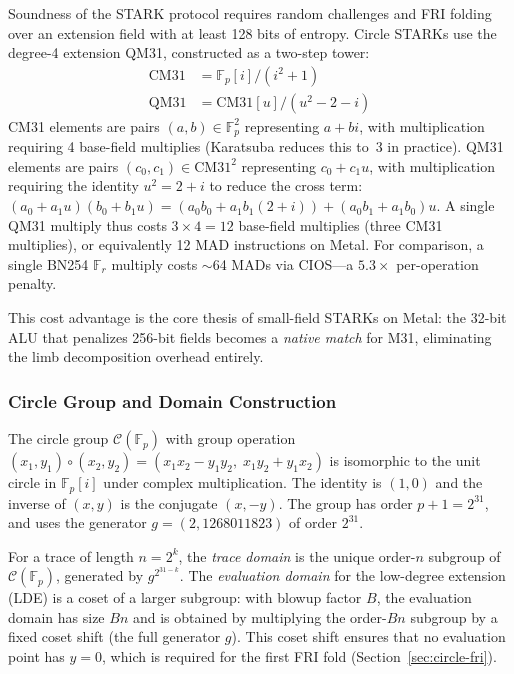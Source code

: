 Soundness of the STARK protocol requires random challenges and FRI folding
over an extension field with at least 128 bits of entropy.  Circle STARKs
use the degree-4 extension QM31, constructed as a two-step tower:
%
\begin{align}
  \text{CM31} &= \mathbb{F}_p[i] / (i^2 + 1) \label{eq:cm31} \\
  \text{QM31} &= \text{CM31}[u] / (u^2 - 2 - i) \label{eq:qm31}
\end{align}
%
CM31 elements are pairs $(a, b) \in \mathbb{F}_p^2$ representing $a + bi$,
with multiplication requiring 4 base-field multiplies (Karatsuba reduces
this to~3 in practice).  QM31 elements are pairs $(c_0, c_1) \in
\text{CM31}^2$ representing $c_0 + c_1 u$, with multiplication requiring
the identity $u^2 = 2 + i$ to reduce the cross term: $(a_0 + a_1 u)(b_0 +
b_1 u) = (a_0 b_0 + a_1 b_1 (2+i)) + (a_0 b_1 + a_1 b_0) u$.
A single QM31 multiply thus costs $3 \times 4 = 12$ base-field multiplies
(three CM31 multiplies), or equivalently 12 MAD instructions on Metal.
For comparison, a single BN254 $\mathbb{F}_r$ multiply costs $\sim$64 MADs
via CIOS---a $5.3\times$ per-operation penalty.

This cost advantage is the core thesis of small-field STARKs on Metal:
the 32-bit ALU that penalizes 256-bit fields becomes a \emph{native match}
for M31, eliminating the limb decomposition overhead entirely.

\subsubsection{Circle Group and Domain Construction}
\label{sec:circle-domain}

The circle group $\mathcal{C}(\mathbb{F}_p)$ with group operation
$(x_1, y_1) \circ (x_2, y_2) = (x_1 x_2 - y_1 y_2,\; x_1 y_2 + y_1 x_2)$
is isomorphic to the unit circle in $\mathbb{F}_p[i]$ under complex
multiplication.  The identity is $(1, 0)$ and the inverse of $(x, y)$ is
the conjugate $(x, -y)$.  The group has order $p + 1 = 2^{31}$, and \sys
uses the generator $g = (2, 1268011823)$ of order $2^{31}$.

For a trace of length $n = 2^k$, the \emph{trace domain} is the unique
order-$n$ subgroup of $\mathcal{C}(\mathbb{F}_p)$, generated by
$g^{2^{31-k}}$.  The \emph{evaluation domain} for the low-degree extension
(LDE) is a coset of a larger subgroup: with blowup factor $B$, the
evaluation domain has size $Bn$ and is obtained by multiplying the
order-$Bn$ subgroup by a fixed coset shift (the full generator $g$).  This
coset shift ensures that no evaluation point has $y = 0$, which is required
for the first FRI fold (Section~\ref{sec:circle-fri}).


